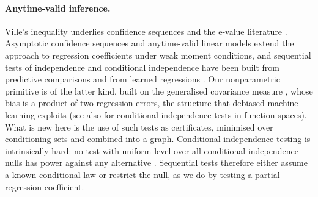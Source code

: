 \paragraph{Anytime-valid inference.} Ville's inequality \citep{ville1939etude}
underlies confidence sequences \citep{darling1967confidence,robbins1970statistical,
howard2021timeuniform} and the e-value literature
\citep{vovk2021evalues,ramdas2023gametheoretic,grunwald2024safe}.
Asymptotic confidence sequences \citep{waudbysmith2024asymptotic} and
anytime-valid linear models \citep{lindon2026anytime} extend the approach to
regression coefficients under weak moment conditions, and sequential tests of
independence and conditional independence have been built from predictive
comparisons and from learned regressions
\citep{podkopaev2023sequential,waudbysmith2023sequential}. Our nonparametric primitive is
of the latter kind, built on the generalised covariance measure
\citep{shah2020hardness}, whose bias is a product of two regression errors, the
structure that debiased machine learning exploits \citep{chernozhukov2018double}
(see also \citealt{lundborg2022conditional} for conditional independence tests in
function spaces). What is new here is the use of such tests as certificates,
minimised over conditioning sets and combined into a graph. Conditional-independence
testing is intrinsically hard: no test with uniform level over all
conditional-independence nulls has power against any alternative
\citep{shah2020hardness}. Sequential tests therefore either assume a known
conditional law \citep{shaer2023model,grunwald2024modelx} or restrict the null,
as we do by testing a partial regression coefficient.

